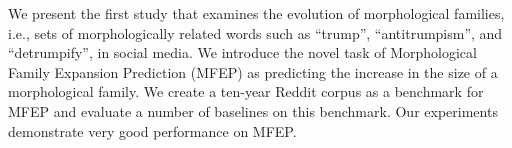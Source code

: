 We present the first study that examines the evolution of morphological families, i.e., sets of morphologically related words such as ``trump'', ``antitrumpism'', and ``detrumpify'', in social media. We introduce the novel task of Morphological Family Expansion Prediction (MFEP) as predicting the increase in the size of a morphological family. We create a ten-year Reddit corpus as a benchmark for MFEP and evaluate a number of baselines on this benchmark. Our experiments demonstrate very good performance on MFEP.

